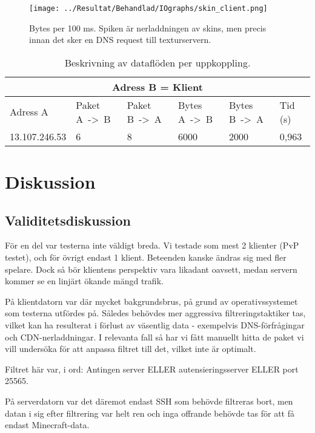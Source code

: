 \documentclass[journal,comsoc]{IEEEtran}
\begin{document}
\begin{figure} [H]
  \centering
  \texttt{[image: ../Resultat/Behandlad/IOgraphs/skin\_client.png]}
  \caption{Bytes per 100 ms. Spiken är nerladdningen av skins, men precis innan det sker en DNS request till texturservern.}
  \label{fig:client:skin}
\end{figure}
\begin{table} [H]
  \begin{center}
    \label{table:client:skin}
    \begin{tabular}{ | m{1.5cm} |  m{1cm} | m{1cm}| m{1cm}|m{1cm}|m{0.5cm}| } 
      \hline
      \multicolumn{6}{|c|}{Adress B = Klient} \\
      \hline
      Adress A & Paket A~->~B & Paket B~->~A & Bytes A~->~B & Bytes B~->~A & Tid (s) \\
      \hline
      13.107.246.53 & 6 & 8 & 6000 & 2000 & 0,963 \\
      \hline 
    \end{tabular}
  \end{center}
  \caption{Beskrivning av dataflöden per uppkoppling.}
\end{table}

\section{Diskussion}
\label{discuss:validity}
\subsection{Validitetsdiskussion}
För en del var testerna inte väldigt breda. Vi testade som mest 2 klienter (PvP testet), och för övrigt endast 1 klient. Beteenden kanske ändras sig med fler spelare. Dock så bör klientens perspektiv vara likadant oavsett, medan servern kommer se en linjärt ökande mängd trafik.

På klientdatorn var där mycket bakgrundsbrus, på grund av operativssystemet som testerna utfördes på. Således behövdes mer aggressiva filtreringstaktiker tas, vilket kan ha resulterat i förlust av väsentlig data - exempelvis DNS-förfrågingar och CDN-nerladdningar. I relevanta fall så har vi fått manuellt hitta de paket vi vill undersöka för att anpassa filtret till det, vilket inte är optimalt.

Filtret här var, i ord: Antingen server ELLER autensieringsserver ELLER port 25565.

På serverdatorn var det däremot endast SSH som behövde filtreras bort, men datan i sig efter filtrering var helt ren och inga offrande behövde tas för att få endast Minecraft-data.
\end{document}

